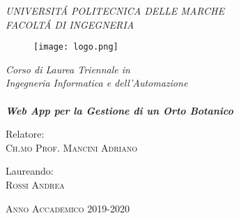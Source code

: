 \thispagestyle{empty}

\begin{center}
  \large
  \textit{UNIVERSIT\'A POLITECNICA DELLE MARCHE\\}
  \vspace*{.5cm}
  \textit{ FACOLT\'A DI INGEGNERIA \\}    
\end{center}


\begin{figure}[h]
	\centering
	\texttt{[image: logo.png]}
\end{figure}
\begin{center}


  

  \vspace*{0.5cm} 
  \emph{Corso di Laurea Triennale in\\Ingegneria Informatica e dell'Automazione\\}
	\hfill \\
  \vspace*{.75cm} \large %
  \emph{\textbf{Web App per la Gestione di un Orto Botanico}}
\end{center}
\vspace*{4.0cm} %


\begin{flushleft}
Relatore:\\\textsc{Ch.mo Prof. Mancini Adriano}\\
\end{flushleft}
\vspace*{-1.75cm}
\begin{flushright}
Laureando:\\\textsc{Rossi Andrea}\\      
\end{flushright}

\vspace*{4cm}

\begin{center}

 \large{\textsc{Anno Accademico 2019-2020}}

\end{center} \clearpage
